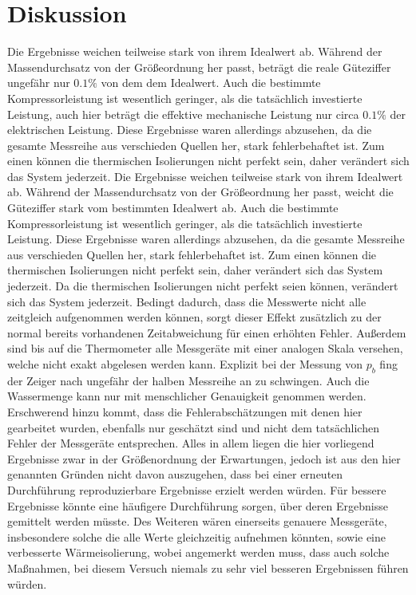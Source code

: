 \section{Diskussion}
\label{sec:Diskussion}
Die Ergebnisse weichen teilweise stark von ihrem Idealwert ab. Während der Massendurchsatz von der Größeordnung her passt, beträgt die reale Güteziffer ungefähr nur $0.1 \%$ von dem dem Idealwert.
Auch die bestimmte Kompressorleistung ist wesentlich geringer, als die tatsächlich investierte Leistung, auch hier beträgt die effektive mechanische Leistung nur circa $0.1 \%$ der elektrischen Leistung.
Diese Ergebnisse waren allerdings abzusehen, da die gesamte Messreihe aus verschieden Quellen her, stark fehlerbehaftet ist.
Zum einen können die thermischen Isolierungen nicht perfekt sein, daher verändert sich das System jederzeit.
Die Ergebnisse weichen teilweise stark von ihrem Idealwert ab. Während der Massendurchsatz von der Größeordnung her passt, weicht die Güteziffer stark vom bestimmten Idealwert ab.
Auch die bestimmte Kompressorleistung ist wesentlich geringer, als die tatsächlich investierte Leistung.
Diese Ergebnisse waren allerdings abzusehen, da die gesamte Messreihe aus verschieden Quellen her, stark fehlerbehaftet ist.
Zum einen können die thermischen Isolierungen nicht perfekt sein, daher verändert sich das System jederzeit.
Da die thermischen Isolierungen nicht perfekt seien können, verändert sich das System jederzeit.
Bedingt dadurch, dass die Messwerte nicht alle zeitgleich aufgenommen werden können, sorgt dieser Effekt zusätzlich zu der normal bereits vorhandenen Zeitabweichung für einen erhöhten Fehler.
Außerdem sind bis auf die Thermometer alle Messgeräte mit einer analogen Skala versehen, welche nicht exakt abgelesen werden kann. Explizit bei der Messung von $p_b$ fing der Zeiger nach ungefähr der halben Messreihe an zu schwingen.
Auch die Wassermenge kann nur mit menschlicher Genauigkeit genommen werden.
Erschwerend hinzu kommt, dass die Fehlerabschätzungen mit denen hier gearbeitet wurden, ebenfalls nur geschätzt sind und nicht dem tatsächlichen Fehler der Messgeräte entsprechen.
Alles in allem liegen die hier vorliegend Ergebnisse zwar in der Größenordnung der Erwartungen, jedoch ist aus den hier genannten Gründen nicht davon auszugehen, dass bei einer erneuten Durchführung reproduzierbare Ergebnisse erzielt werden würden.
Für bessere Ergebnisse könnte eine häufigere Durchführung sorgen, über deren Ergebnisse gemittelt werden müsste.
Des Weiteren wären einerseits genauere Messgeräte, insbesondere solche die alle Werte gleichzeitig aufnehmen könnten, sowie eine verbesserte Wärmeisolierung, 
wobei angemerkt werden muss, dass auch solche Maßnahmen, bei diesem Versuch niemals zu sehr viel besseren Ergebnissen führen würden.
